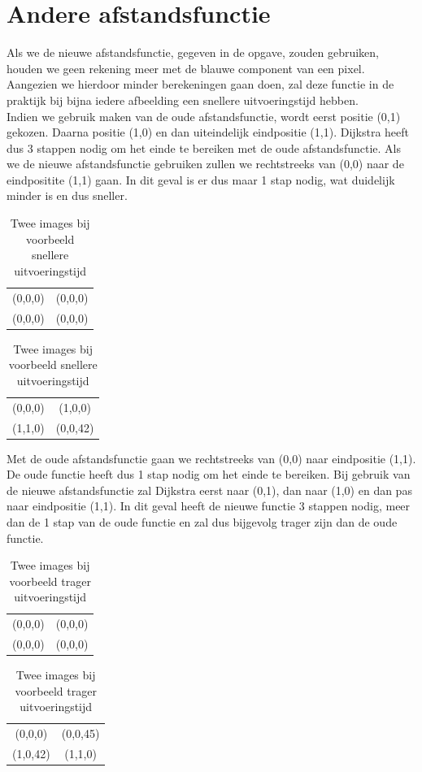 \documentclass[11pt, a4paper]{article}
\begin{document}
\section*{Andere afstandsfunctie}
Als we de nieuwe afstandsfunctie, gegeven in de opgave, zouden gebruiken, houden we geen rekening meer met de blauwe component van een pixel. Aangezien we hierdoor minder berekeningen gaan doen, zal deze functie in de praktijk bij bijna iedere afbeelding een snellere uitvoeringstijd hebben.\\

Indien we gebruik maken van de oude afstandsfunctie, wordt eerst positie (0,1) gekozen. Daarna positie (1,0) en dan uiteindelijk eindpositie (1,1). Dijkstra heeft dus 3 stappen nodig om het einde te bereiken met de oude afstandsfunctie. Als we de nieuwe afstandsfunctie gebruiken zullen we rechtstreeks van (0,0) naar de eindpositite (1,1) gaan. In dit geval is er dus maar 1 stap nodig, wat duidelijk minder is en dus sneller.
\begin{table}[ht]
\centering
\begin{tabular}{|cc|}
\hline
(0,0,0) & (0,0,0) \\
(0,0,0) & (0,0,0) \\ \hline
\end{tabular}
\begin{tabular}{|cc|}
\hline
(0,0,0) & (1,0,0) \\
(1,1,0) & (0,0,42) \\ \hline
\end{tabular}
\caption{Twee images bij voorbeeld snellere uitvoeringstijd}
\end{table}

Met de oude afstandsfunctie gaan we rechtstreeks van (0,0) naar eindpositie (1,1). De oude functie heeft dus 1 stap nodig om het einde te bereiken. Bij gebruik van de nieuwe afstandsfunctie zal Dijkstra eerst naar (0,1), dan naar (1,0) en dan pas naar eindpositie (1,1). In dit geval heeft de nieuwe functie 3 stappen nodig, meer dan de 1 stap van de oude functie en zal dus bijgevolg trager zijn dan de oude functie.
\begin{table}[ht]
\centering
\begin{tabular}{|cc|}
\hline
(0,0,0) & (0,0,0) \\
(0,0,0) & (0,0,0) \\ \hline
\end{tabular}
\begin{tabular}{|cc|}
\hline
(0,0,0) & (0,0,45) \\
(1,0,42) & (1,1,0) \\ \hline
\end{tabular}
\caption{Twee images bij voorbeeld trager uitvoeringstijd}
\end{table}
\end{document}
